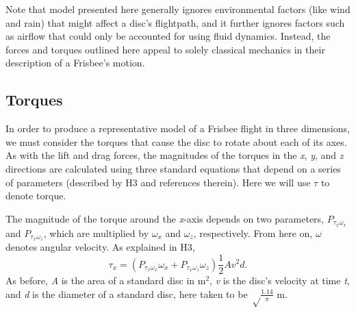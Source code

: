 \documentclass[a4paper,12pt, oneside]{article}
\newcommand{\red}[1]{\textcolor{red}{#1}}
\begin{document}
Note that model presented here generally ignores environmental factors (like wind and rain) that might affect a disc's flightpath, and it further ignores factors such as airflow that could only be accounted for using fluid dynamics. Instead, the forces and torques outlined here appeal to solely classical mechanics in their description of a Frisbee's motion.
\subsection{Torques}

In order to produce a representative model of a Frisbee flight in three dimensions, we must consider the torques that cause the disc to rotate about each of its axes. As with the lift and drag forces, the magnitudes of the torques in the \textit{x}, \textit{y}, and \textit{z} directions are calculated using three standard equations that depend on a series of parameters (described by H3 and references therein). Here we will use $\tau$ to denote torque.

The magnitude of the torque around the \textit{x}-axis depends on two parameters, $P_{\tau_x\omega_x}$ and $P_{\tau_x\omega_z}$, which are multiplied by $\omega_x$ and $\omega_z$, respectively. From here on, $\omega$ denotes angular velocity. As explained in H3,
\begin{equation}
  \tau_x=(P_{\tau_x\omega_x}\omega_x+P_{\tau_x\omega_z}\omega_z)\frac{1}2Av^2d.
\end{equation}
As before, \textit{A} is the area of a standard disc in m$^2$, \textit{v} is the disc's velocity at time \textit{t}, and \textit{d} is the diameter of a standard disc, here taken to be $\sqrt\frac{1.14}\pi$ m.
\end{document}
